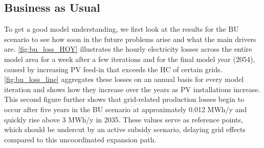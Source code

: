 \documentclass[12PT, ]{article}
\begin{document}
\subsection{Business as Usual } \label{subsec:}%

To get a good model understanding, we first look at the results for the BU scenario to see how soon in the future problems arise and what the main drivers are.
\ref{fig:bu_loss_HOY} illustrates the hourly electricity losses across the entire model area for a week after a few iterations and for the final model year (2054), caused by increasing PV feed-in that exceeds the HC of certain grids.
\ref{fig:bu_loss_line} aggregates these losses on an annual basis for every model iteration and shows how they increase over the years as PV installations increase. This second figure further shows that grid-related production losses begin to occur after five years in the BU scenario at approximately 0.012 MWh/y and quickly rise above 3 MWh/y in 2035. These values serve as reference points, which should be undercut by an active subsidy scenario, delaying grid effects compared to this uncoordinated expansion path.
\end{document}
